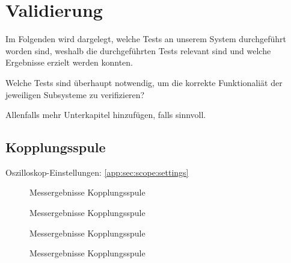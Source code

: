 \chapter{Validierung}
\label{chap:validierung}

Im Folgenden  wird dargelegt,  welche Tests  an unserem  System durchgef\"uhrt
worden  sind, weshalb  die  durchgef\"uhrten Tests  relevant  sind und  welche
Ergebnisse erzielt werden konnten.

\anweisung  Welche   Tests  sind   \"uberhaupt  notwendig,  um   die  korrekte
Funktionali\"at der jeweiligen Subsysteme zu verifizieren?

\anweisung Allenfalls mehr Unterkapitel hinzuf\"ugen, falls sinnvoll.

\section{Kopplungsspule}
\label{sec:val:coupling:coil}

Oszilloskop-Einstellungen: \ref{app:sec:scope:settings}

\begin{figure}[h!tb]
    \centering
    
    \caption[Messresultate Kopplungsspule]{Messergebnisse Kopplungsspule}
    \label{fig:meas:coupling:coil:L}
\end{figure}

\begin{figure}[h!tb]
    \centering
    
    \caption[Messresultate Kopplungsspule]{Messergebnisse Kopplungsspule}
    \label{fig:meas:coupling:coil:R}
\end{figure}

\begin{figure}[h!tb]
    \centering
    
    \caption[Messresultate Kopplungsspule]{Messergebnisse Kopplungsspule}
    \label{fig:meas:coupling:coil:R}
\end{figure}

\begin{figure}[h!tb]
    \centering
    
    \caption[Messresultate Kopplungsspule]{Messergebnisse Kopplungsspule}
    \label{fig:meas:coupling:coil:R}
\end{figure}

